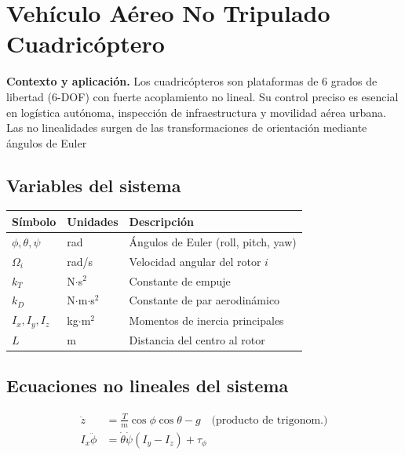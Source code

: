 \documentclass{uofa-eng-assignment}
\begin{document}
\maketitle
\section*{Vehículo Aéreo No Tripulado Cuadricóptero}

\textbf{Contexto y aplicación.} 
Los cuadricópteros son plataformas de 6 grados de libertad (6-DOF) con fuerte acoplamiento no lineal. 
Su control preciso es esencial en logística autónoma, inspección de infraestructura y movilidad aérea urbana. Las no linealidades surgen de las transformaciones de orientación mediante ángulos de Euler

\subsection*{Variables del sistema}

\begin{center}
\begin{tabular}{lll}
\hline
\textbf{Símbolo} & \textbf{Unidades} & \textbf{Descripción} \\
\hline
$\phi, \theta, \psi$ & rad & Ángulos de Euler (roll, pitch, yaw) \\
$\Omega_i$ & rad/s & Velocidad angular del rotor $i$ \\
$k_T$ & N$\cdot$s$^2$ & Constante de empuje \\
$k_D$ & N$\cdot$m$\cdot$s$^2$ & Constante de par aerodinámico \\
$I_x, I_y, I_z$ & kg$\cdot$m$^2$ & Momentos de inercia principales \\
$L$ & m & Distancia del centro al rotor \\
\hline
\end{tabular}
\end{center}

\subsection*{Ecuaciones no lineales del sistema}

\begin{tcolorbox}[colback=brown!10!white, colframe=brown!60!black, title=No linealidades principales]
\begin{align*}
    \ddot{z} &= \frac{T}{m} \cos\phi \cos\theta - g 
\quad \text{(producto de trigonom.)} \\
I_x \ddot{\phi} 
&= \dot{\theta}\dot{\psi}(I_y - I_z) + \tau_\phi
\end{align*}
\end{tcolorbox}
\end{document}
